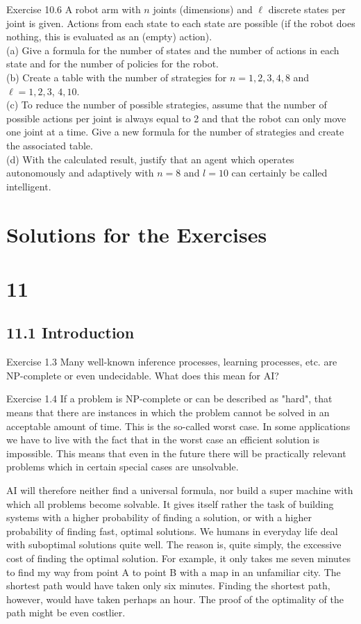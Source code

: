 \documentclass[10pt]{article}
\begin{document}
Exercise 10.6 A robot arm with $n$ joints (dimensions) and $\ell$ discrete states per joint is given. Actions from each state to each state are possible (if the robot does nothing, this is evaluated as an (empty) action).\\
(a) Give a formula for the number of states and the number of actions in each state and for the number of policies for the robot.\\
(b) Create a table with the number of strategies for $n=1,2,3,4,8$ and $\ell=1,2,3$, $4,10$.\\
(c) To reduce the number of possible strategies, assume that the number of possible actions per joint is always equal to 2 and that the robot can only move one joint at a time. Give a new formula for the number of strategies and create the associated table.\\
(d) With the calculated result, justify that an agent which operates autonomously and adaptively with $n=8$ and $l=10$ can certainly be called intelligent.

\section*{Solutions for the Exercises}
\section*{11}
\subsection*{11.1 Introduction}
Exercise 1.3 Many well-known inference processes, learning processes, etc. are NP-complete or even undecidable. What does this mean for AI?

Exercise 1.4 If a problem is NP-complete or can be described as "hard", that means that there are instances in which the problem cannot be solved in an acceptable amount of time. This is the so-called worst case. In some applications we have to live with the fact that in the worst case an efficient solution is impossible. This means that even in the future there will be practically relevant problems which in certain special cases are unsolvable.

AI will therefore neither find a universal formula, nor build a super machine with which all problems become solvable. It gives itself rather the task of building systems with a higher probability of finding a solution, or with a higher probability of finding fast, optimal solutions. We humans in everyday life deal with suboptimal solutions quite well. The reason is, quite simply, the excessive cost of finding the optimal solution. For example, it only takes me seven minutes to find my way from point A to point B with a map in an unfamiliar city. The shortest path would have taken only six minutes. Finding the shortest path, however, would have taken perhaps an hour. The proof of the optimality of the path might be even costlier.
\end{document}
